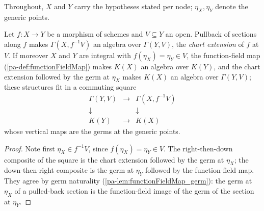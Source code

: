 Throughout, \(X\) and \(Y\) carry the hypotheses stated per node; \(\eta_X, \eta_Y\)
denote the generic points.

\begin{definition}
  \label{pa-def:pullbackSectionsAlgebra}
  \leanok

  Let \(f : X \to Y\) be a morphism of schemes and \(V \subseteq Y\) an open. Pullback
  of sections along \(f\) makes \(\Gamma(X, f^{-1}V)\) an algebra over
  \(\Gamma(Y, V)\), the \emph{chart extension} of \(f\) at \(V\). If moreover \(X\) and
  \(Y\) are integral with \(f(\eta_X) = \eta_Y \in V\), the function-field map
  (\ref{pa-def:functionFieldMap}) makes \(K(X)\) an algebra over \(K(Y)\), and the chart
  extension followed by the germ at \(\eta_X\) makes \(K(X)\) an algebra over
  \(\Gamma(Y, V)\); these structures fit in a commuting square
  \[
    \begin{array}{ccc}
      \Gamma(Y, V) & \longrightarrow & \Gamma(X, f^{-1}V) \\
      \downarrow & & \downarrow \\
      K(Y) & \longrightarrow & K(X)
    \end{array}
  \]
  whose vertical maps are the germs at the generic points.
\end{definition}
\begin{proof}
  \leanok
  Note first \(\eta_X \in f^{-1}V\), since \(f(\eta_X) = \eta_Y \in V\). The
  right-then-down composite of the square is the chart extension followed by the germ
  at \(\eta_X\); the down-then-right composite is the germ at \(\eta_Y\) followed by
  the function-field map. They agree by germ naturality
  (\ref{pa-lem:functionFieldMap_germ}): the germ at \(\eta_X\) of a pulled-back section is
  the function-field image of the germ of the section at \(\eta_Y\).
\end{proof}

